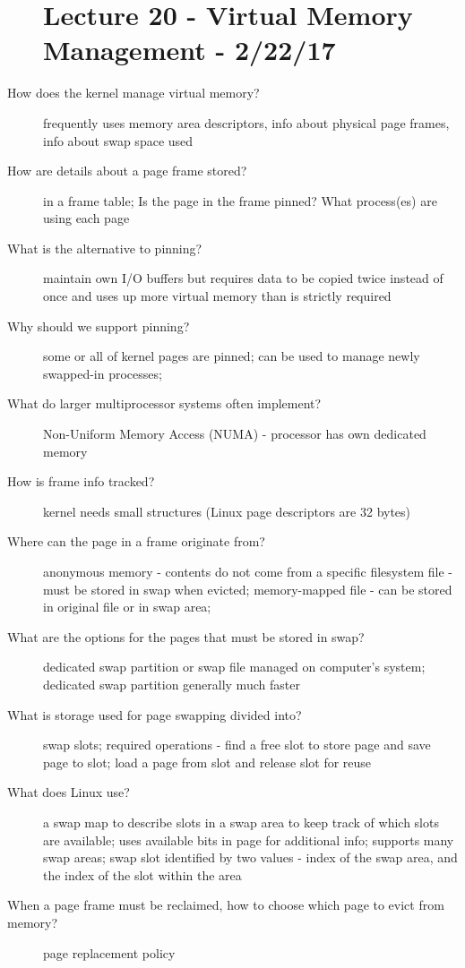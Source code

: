 \documentclass[10pt]{article}
\begin{document}
\begin{description}
\section{Lecture 20 - Virtual Memory Management - 2/22/17}
\item[How does the kernel manage virtual memory?]
  frequently uses memory area descriptors, info about physical page frames, info about swap space used
\item[How are details about a page frame stored?]
  in a frame table; Is the page in the frame pinned? What process(es) are using each page
\item[What is the alternative to pinning?]
  maintain own I/O buffers but requires data to be copied twice instead of once and uses up more virtual memory than is strictly required
\item[Why should we support pinning?]
  some or all of kernel pages are pinned; can be used to manage newly swapped-in processes;
\item[What do larger multiprocessor systems often implement?]
  Non-Uniform Memory Access (NUMA) - processor has own dedicated memory
\item[How is frame info tracked?]
  kernel needs small structures (Linux page descriptors are 32 bytes)
\item[Where can the page in a frame originate from?]
  anonymous memory - contents do not come from a specific filesystem file - must be stored in swap when evicted;
  memory-mapped file - can be stored in original file or in swap area;
\item[What are the options for the pages that must be stored in swap?]
  dedicated swap partition or swap file managed on computer's system;
  dedicated swap partition generally much faster
\item[What is storage used for page swapping divided into?]
  swap slots;
  required operations - find a free slot to store page and save page to slot; load a page from slot and release slot for reuse
\item[What does Linux use?]
  a swap map to describe slots in a swap area to keep track of which slots are available;
  uses available bits in page for additional info;
  supports many swap areas;
  swap slot identified by two values - index of the swap area, and the index of the slot within the area
\item[When a page frame must be reclaimed, how to choose which page to evict from memory?]
  page replacement policy

\end{description}
\end{document}
